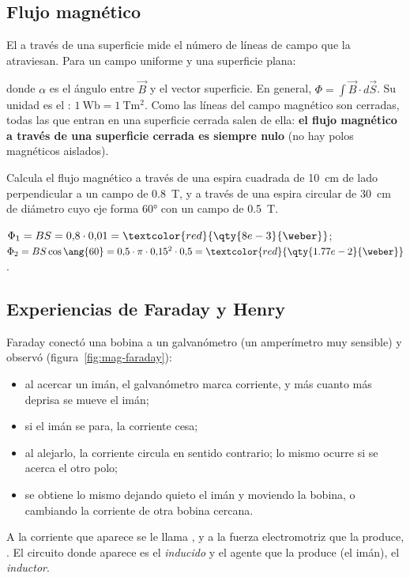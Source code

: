 \subsection{Flujo magnético}\label{subsec:mag-flujo}

El  a través de una superficie mide el número de líneas de campo que la atraviesan. Para un campo
uniforme y una superficie plana:
\begin{centeredequation}
     \label{eq:mag-flujo}
\end{centeredequation}
donde \(\alpha\) es el ángulo entre \(\vec B\) y el vector superficie. En general, \(\Phi = \int\vec B\cdot d\vec S\). Su unidad es
el : \(\qty{1}{\weber} = \qty{1}{\tesla\m\squared}\). Como las líneas del campo magnético son cerradas, todas las que
entran en una superficie cerrada salen de ella: \textbf{el flujo magnético a través de una superficie cerrada es siempre nulo}
(no hay polos magnéticos aislados).

\begin{exercise}
    Calcula el flujo magnético a través de una espira cuadrada de \qty{10}{\cm} de lado perpendicular a un campo de
    \qty{0.8}{\tesla}, y a través de una espira circular de \qty{30}{\cm} de diámetro cuyo eje forma \ang{60} con un campo de
    \qty{0.5}{\tesla}.
    \begin{solu}
        \(\Phi_1 = B S = 0{,}8\cdot 0{,}01 = \textcolor{red}{\qty{8e-3}{\weber}}\);
        \(\Phi_2 = B S\cos\ang{60} = 0{,}5\cdot\pi\cdot 0{,}15^2\cdot 0{,}5 = \textcolor{red}{\qty{1.77e-2}{\weber}}\).
    \end{solu}
\end{exercise}

\subsection{Experiencias de Faraday y Henry}\label{subsec:mag-faraday}

Faraday conectó una bobina a un galvanómetro (un amperímetro muy sensible) y observó (figura~\ref{fig:mag-faraday}):
\begin{itemize}
    \item al acercar un imán, el galvanómetro marca corriente, y más cuanto más deprisa se mueve el imán;
    \item si el imán se para, la corriente cesa;
    \item al alejarlo, la corriente circula en sentido contrario; lo mismo ocurre si se acerca el otro polo;
    \item se obtiene lo mismo dejando quieto el imán y moviendo la bobina, o cambiando la corriente de otra bobina cercana.
\end{itemize}
A la corriente que aparece se le llama , y a la fuerza electromotriz que la produce, .
El circuito donde aparece es el \emph{inducido} y el agente que la produce (el imán), el \emph{inductor}.

